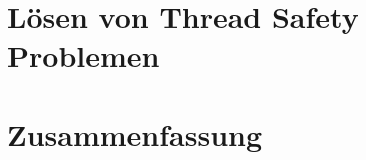 \documentclass[ openright,titlepage,numbers=noenddot,headinclude,%
                footinclude=true,cleardoublepage=empty,abstractoff, %
                BCOR=5mm,paper=a4,fontsize=11pt,%
                ngerman,american,%
                ]{scrreprt}
\begin{document}
\chapter{Lösen von Thread Safety Problemen}
 
 

 \chapter{Zusammenfassung}
 
 

\appendix
\cleardoublepage
%
%
\cleardoublepage
\end{document}
